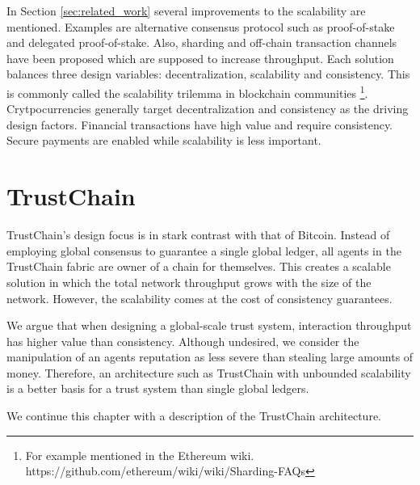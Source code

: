 In Section \ref{sec:related_work} several improvements to the scalability are mentioned. Examples are
alternative consensus protocol such as proof-of-stake and delegated proof-of-stake. Also, sharding
and off-chain transaction channels have been proposed which are supposed to increase throughput.
Each solution balances three design variables: decentralization, scalability and consistency. This
is commonly called the scalability trilemma in blockchain communities \footnote{For example mentioned in the Ethereum wiki. https://github.com/ethereum/wiki/wiki/Sharding-FAQs}.
Crytpocurrencies generally target decentralization and consistency as the driving design factors. 
Financial transactions have high value and require consistency. Secure payments are enabled while 
scalability is less important.


\section{TrustChain}
\label{sec:trustchain}


TrustChain's design focus is in stark contrast with that of
Bitcoin. Instead of employing global consensus to guarantee a single global ledger, 
all agents in the TrustChain fabric are owner of a chain for themselves. This creates a scalable 
solution in which the total network throughput grows with the size of the network. However, the
scalability comes at the cost of consistency guarantees. 

We argue that when designing a global-scale
trust system, interaction throughput has higher value than consistency. Although undesired, we 
consider the manipulation of an agents reputation as less severe than stealing large amounts of 
money. Therefore, an architecture such as TrustChain with unbounded scalability is a better basis
for a trust system than single global ledgers.

We continue this chapter with a description of the TrustChain architecture.

